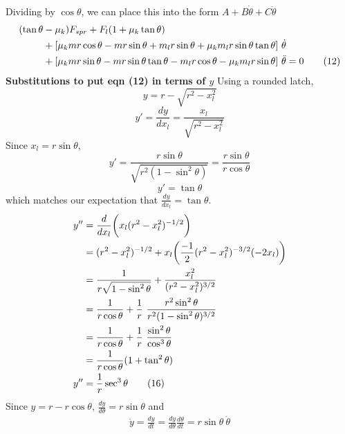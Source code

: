 \documentclass[12pt]{article}
\begin{document}
\newline
Dividing by $\cos{\theta}$, we can place this into the form $A + B \dot{\theta} + C \ddot{\theta}$
\begin{align}
    (\tan{\theta} & - \mu_k) F_{spr} + F_l(1+\mu_k \tan{\theta}) \notag \\
    & + [\mu_k mr \cos{\theta} - mr \sin{\theta} + m_l r \sin{\theta} + \mu_k m_l r \sin{\theta} \tan{\theta}]\ \dot{\theta} \notag \\
    & + [\mu_k mr \sin{\theta} - mr \sin{\theta} \tan{\theta} - m_l r \cos{\theta} - \mu_k m_l r \sin{\theta}]\ \ddot{\theta} = 0 \tag{12}
\end{align}
\newline
\noindent \textbf{Substitutions to put eqn (12) in terms of $y$}
\newline
Using a rounded latch,
\[\tag{13}
    y = r - \sqrt{r^2 - x_l^2}
\]
\[\tag{14}
    y' = \frac{dy}{dx_l} = \frac{x_l}{\sqrt{r^2 - x_l^2}}
\]
Since $x_l = r \sin{\theta}$,
\[
    y' = \frac{r \sin{\theta}}{\sqrt{r^2 (1 - \sin^2{\theta})}} = \frac{r \sin{\theta}}{r \cos{\theta}}
\]
\[\tag{15}
    y' = \tan{\theta}
\]
which matches our expectation that $\frac{dy}{dx_l} = \tan{\theta}$.
\newline
\begin{align}
    y'' & = \frac{d}{dx_l} \biggl( x_l (r^2 - x_l^2)^{-1/2} \biggr) \notag \\
    & = (r^2 - x_l^2)^{-1/2} + x_l \biggl( \frac{-1}{2} (r^2 - x_l^2)^{-3/2} (-2 x_l) \biggr) \notag  \\
    & = \frac{1}{r \sqrt{1 - \sin^2{\theta}}} + \frac{x_l^2}{(r^2 - x_l^2)^{3/2}} \notag \\
    & = \frac{1}{r \cos{\theta}} + \frac{1}{r} \ \frac{r^2 \sin^2{\theta}}{r^2 (1- \sin^2{\theta})^{3/2}} \notag \\
    & = \frac{1}{r \cos{\theta}} + \frac{1}{r} \ \frac{\sin^2{\theta}}{\cos^3{\theta}} \notag \\
    & = \frac{1}{r \cos{\theta}} (1 + \tan^2{\theta}) \notag \\
    y'' & = \frac{1}{r} \sec^3{\theta} \tag{16}
\end{align}
\newline
Since $y = r - r \cos{\theta}$, $\frac{dy}{d\theta} = r \sin{\theta}$ and 
\begin{align}
    \dot{y} = \frac{dy}{dt} = \frac{dy}{d\theta} \frac{d\theta}{dt} = r \sin{\theta} \ \dot{\theta} \tag{17}
\end{align}
\newline
\end{document}

